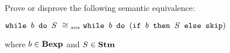\newcommand{\exFour}
{$\wbS{b}{S}~\cong{}_{sos}~\wbS{b}{(\ifABC{b}{S}{\skipistr})} $}

\newcommand{\exFourIff}
{$\confSs{\wbS{b}{S}}{s}\Rar{*}s'~\iff{}~\confSs{\wbS{b}
{(\ifABC{b}{S}{\skipistr})}}{s}\Rar{*}s'$}

\newcommand{\exFourLtR}
{$\confSs{\wbS{b}{S}}{s}\Rar{*}s'~\Longrightarrow{}~\confSs{\wbS{b}
{(\ifABC{b}{S}{\skipistr})}}{s}\Rar{*}s'$}

\newcommand{\exFourRtL}
{$\confSs{\wbS{b}
{(\ifABC{b}{S}{\skipistr})}}{s}\Rar{*}s'~\Longrightarrow{}~
\confSs{\wbS{b}{S}}{s}\Rar{*}s'$}

\newcommand{\exFourRS}{\confSs{\wbS{b}{(\ifABC{b}{S}{\skipistr})}}{s}}

{
	Prove or disprove the following semantic equivalence:\\
	\begin{center}
	\exFour{}
	\end{center}
	where $b\in\mbox{\textbf{Bexp}}$ and $S\in\mbox{\textbf{Stm}}$
}
